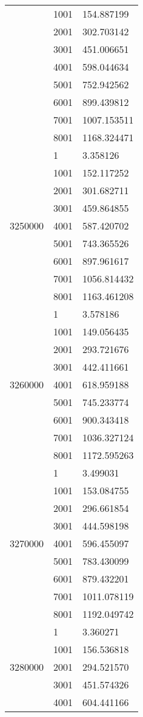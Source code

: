 \begin{table}[htb!]
\begin{tabular}{lll}
 & 1001 & 154.887199 \\
 & 2001 & 302.703142 \\
 & 3001 & 451.006651 \\
 & 4001 & 598.044634 \\
 & 5001 & 752.942562 \\
 & 6001 & 899.439812 \\
 & 7001 & 1007.153511 \\
 & 8001 & 1168.324471 \\
\multirow[c]{9}{*}{3250000} & 1 & 3.358126 \\
 & 1001 & 152.117252 \\
 & 2001 & 301.682711 \\
 & 3001 & 459.864855 \\
 & 4001 & 587.420702 \\
 & 5001 & 743.365526 \\
 & 6001 & 897.961617 \\
 & 7001 & 1056.814432 \\
 & 8001 & 1163.461208 \\
\multirow[c]{9}{*}{3260000} & 1 & 3.578186 \\
 & 1001 & 149.056435 \\
 & 2001 & 293.721676 \\
 & 3001 & 442.411661 \\
 & 4001 & 618.959188 \\
 & 5001 & 745.233774 \\
 & 6001 & 900.343418 \\
 & 7001 & 1036.327124 \\
 & 8001 & 1172.595263 \\
\multirow[c]{9}{*}{3270000} & 1 & 3.499031 \\
 & 1001 & 153.084755 \\
 & 2001 & 296.661854 \\
 & 3001 & 444.598198 \\
 & 4001 & 596.455097 \\
 & 5001 & 783.430099 \\
 & 6001 & 879.432201 \\
 & 7001 & 1011.078119 \\
 & 8001 & 1192.049742 \\
\multirow[c]{9}{*}{3280000} & 1 & 3.360271 \\
 & 1001 & 156.536818 \\
 & 2001 & 294.521570 \\
 & 3001 & 451.574326 \\
 & 4001 & 604.441166 \\

\end{tabular}
\end{table}
